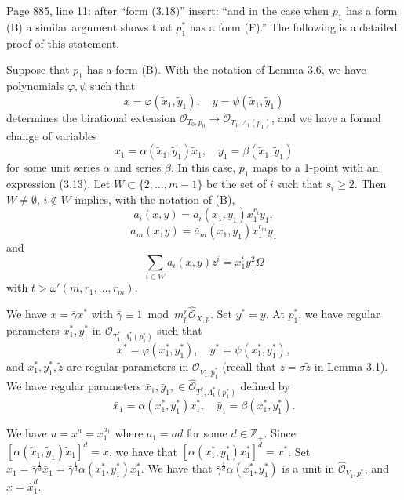 \documentclass[11pt]{article}
\theoremstyle{plain}
\newcommand{\Oh}[1]{\widehat{\mathcal{O}}_{#1}}
\begin{document}

Page 885, line 11: after ``form (3.18)'' insert: ``and in the case when $p_1$ has a form (B) a similar argument shows that $p_1^*$ has a form (F).'' The following is a detailed proof of this statement.

Suppose that $p_1$ has a form (B). With the notation of Lemma 3.6, we have polynomials $\varphi, \psi$ such that
\[
x = \varphi(\tilde{x}_1, \tilde{y}_1), \quad y = \psi(\tilde{x}_1, \tilde{y}_1)
\]
determines the birational extension $\mathcal{O}_{T_0,p_0} \to \mathcal{O}_{T_1,\Lambda_1(p_1)}$, and we have a formal change of variables
\[
x_1 = \alpha(\tilde{x}_1, \tilde{y}_1)\tilde{x}_1, \quad y_1 = \beta(\tilde{x}_1, \tilde{y}_1)
\]
for some unit series $\alpha$ and series $\beta$. In this case, $p_1$ maps to a 1-point with an expression (3.13). Let $W \subset \{2, \ldots, m-1\}$ be the set of $i$ such that $s_i \geqslant 2$. Then $W \neq \emptyset$, $i \notin W$ implies, with the notation of (B),
\[
a_i(x, y) = \bar{a}_i(x_1, y_1) x_1^{r_i} y_1,
\]
\[
a_m(x, y) = \bar{a}_m(x_1, y_1) x_1^{r_m} y_1
\]
and
\[
\sum_{i \in W} a_i(x, y) z^i = x_1^t y_1^2 \Omega
\]
with $t > \omega'(m, r_1, \ldots, r_m)$.

We have $x = \bar{\gamma} x^*$ with $\bar{\gamma} \equiv 1 \bmod m_p^r \Oh{X,p}$. Set $y^* = y$. At $p_1^*$, we have regular parameters $x_1^*, y_1^*$ in $\mathcal{O}_{T_1^*,\Lambda_1^*(p_1^*)}$ such that
\[
x^* = \varphi(x_1^*, y_1^*), \quad y^* = \psi(x_1^*, y_1^*),
\]
and $x_1^*, y_1^*, \tilde{z}$ are regular parameters in $\mathcal{O}_{V_1,\bar{p}_1^*}$ (recall that $z = \sigma \tilde{z}$ in Lemma 3.1). We have regular parameters $\bar{x}_1, \bar{y}_1, \in \Oh{T_1^*,\Lambda_1^*(p_1^*)}$ defined by
\[
\bar{x}_1 = \alpha(x_1^*, y_1^*) x_1^*, \quad \bar{y}_1 = \beta(x_1^*, y_1^*).
\]

We have $u = x^a = x_1^{a_1}$ where $a_1 = ad$ for some $d \in \mathbb{Z}_+$. Since $[\alpha(\tilde{x}_1, \tilde{y}_1)\tilde{x}_1]^d = x$, we have that $[\alpha(x_1^*, y_1^*)x_1^*]^d = x^*$. Set $\hat{x}_1 = \bar{\gamma}^{\frac{1}{d}} \bar{x}_1 = \bar{\gamma}^{\frac{1}{d}} \alpha(x_1^*, y_1^*) x_1^*$. We have that $\bar{\gamma}^{\frac{1}{d}} \alpha(x_1^*, y_1^*)$ is a unit in $\Oh{V_1,p_1^*}$, and $x = \hat{x}_1^d$.
\end{document}
